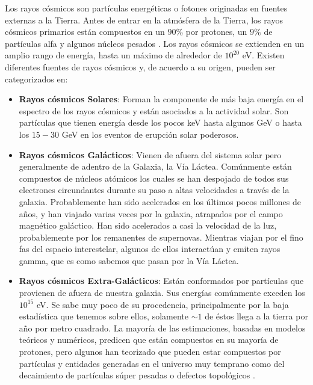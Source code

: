 \documentclass[a4paper,10pt]{article}
\numberwithin{equation}{section}
\begin{document}
Los rayos cósmicos son partículas energéticas o fotones originadas en fuentes 
externas a la Tierra. Antes de entrar en la atmósfera de la Tierra, los rayos cósmicos 
primarios están compuestos en un $90\%$ por protones, un $9\%$ de partículas alfa y 
algunos núcleos pesados \cite{mok}. Los rayos cósmicos se extienden en un amplio 
rango de energía, hasta un máximo de alrededor de $10^{20}$ eV. Existen diferentes fuentes 
de rayos cósmicos y, de acuerdo a su origen, pueden ser categorizados en:

\begin{itemize}
 \item \textbf{Rayos cósmicos Solares}: Forman la componente de más baja energía 
 en el espectro de los rayos cósmicos y están asociados a la actividad solar. Son 
 partículas que tienen energía desde los pocos keV hasta algunos GeV o hasta 
 los $15-30$ GeV en los eventos de erupción solar poderosos.
 \item \textbf{Rayos cósmicos Galácticos}: Vienen de afuera del sistema solar pero 
 generalmente de adentro de la Galaxia, la Vía Láctea. Comúnmente están compuestos 
 de núcleos atómicos los cuales se han despojado de todos sus electrones circundantes 
 durante su paso a altas velocidades a través de la galaxia. Probablemente han sido 
 acelerados en los últimos pocos millones de años, y han viajado varias veces por 
 la galaxia, atrapados por el campo magnético galáctico. Han sido acelerados a 
 casi la velocidad de la luz, probablemente por los remanentes de supernovas. Mientras 
 viajan por el fino fas del espacio interestelar, algunos de ellos interactúan y 
 emiten rayos gamma, que es como sabemos que pasan por la Vía Láctea.
 \item \textbf{Rayos cósmicos Extra-Galácticos}: Están conformados por partículas 
 que provienen de afuera de nuestra galaxia. Sus energías comúnmente exceden los 
 $10^{15}$ eV. Se sabe muy poco de su procedencia, principalmente por la baja 
 estadística que tenemos sobre ellos, solamente $\sim 1$ de éstos llega a la 
 tierra por año por metro cuadrado. La mayoría de las estimaciones, basadas en 
 modelos teóricos y numéricos, predicen que están compuestos en su mayoría 
 de protones, pero algunos han teorizado que pueden estar compuestos por 
 partículas y entidades generadas en el universo muy temprano como del 
 decaimiento de partículas súper pesadas o defectos topológicos \cite{nagano}.
\end{itemize}
\end{document}
